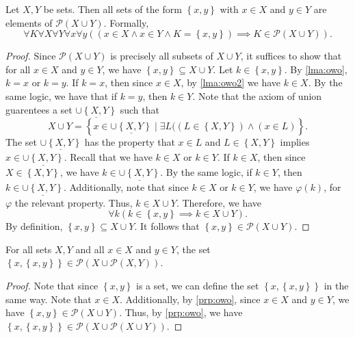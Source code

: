 \begin{proposition}\label{prp:owo}
	Let $X,Y$ be sets. Then all sets of the form $\left\{ x,y \right\} $ with $x\in X$ and $y\in Y$ are elements of $\mathcal{P} (X \cup Y)$. Formally,
	\[
		\forall K\forall X\forall Y\forall x\forall y((x\in X \land x\in Y \land K=\left\{ x,y \right\} ) \implies K\in \mathcal{P} (X \cup Y))
	.\]
\end{proposition}
\begin{proof}
	Since $\mathcal{P} (X \cup Y)$ is precisely all subsets of $X \cup Y$, it suffices to show that for all $x\in X$ and $y\in Y$, we have $\left\{ x,y \right\} \subseteq X \cup Y$. Let $k\in \left\{ x,y \right\} $. By \cref{lma:owo}, $k=x$ or $k=y$. If $k=x$, then since $x\in X$, by \cref{lma:owo2} we have $k\in X$. By the same logic, we have that if $k=y$, then $k\in Y$. Note that the axiom of union guarentees a set $\underline{\cup\left\{ X,Y \right\} } $ such that
	\[
		X \cup Y = \left\{ x\in \underline{\cup \left\{ X,Y \right\} } \mid \exists L((L\in \left\{ X,Y \right\} )\land (x\in L) \right\} 
	.\]
	The set $\underline{\cup \left\{ X,Y \right\} }$ has the property that $x\in L$ and $L\in \left\{ X,Y \right\} $ implies $x\in \underline{\cup \left\{ X,Y \right\} }$. Recall that we have $k\in X$ or $k\in Y$. If $k\in X$, then since $X\in \left\{ X,Y \right\} $, we have $k\in \underline{\cup \left\{ X,Y \right\} }$. By the same logic, if $k\in Y$, then $k\in\underline{\cup \left\{ X,Y \right\} }$. Additionally, note that since $k\in X$ or $k\in Y$, we have $\varphi (k)$, for $\varphi $ the relevant property. Thus, $k\in X \cup Y$. Therefore, we have
	\[
		\forall k(k\in \left\{ x,y \right\} \implies k\in X \cup Y)
	.\]
	By definition, $\left\{ x,y \right\} \subseteq X \cup Y$. It follows that $\left\{ x,y \right\} \in \mathcal{P} (X \cup Y)$.
\end{proof}
\begin{corollary}\label{cor:pairs}
	For all sets $X,Y$ and all $x\in X$ and $y\in Y$, the set $\left\{ x,\left\{ x,y \right\}  \right\} \in \mathcal{P} (X \cup \mathcal{P} (X,Y))$.
\end{corollary}
\begin{proof}
	Note that since $\left\{ x,y \right\} $ is a set, we can define the set $\left\{ x,\left\{ x,y \right\}  \right\} $ in the same way. Note that $x\in X$. Additionally, by \cref{prp:owo}, since $x\in X$ and $y\in Y$, we have $\left\{ x,y \right\} \in \mathcal{P} (X \cup Y)$. Thus, by \cref{prp:owo}, we have $\left\{ x,\left\{ x,y \right\}  \right\} \in \mathcal{P} (X \cup \mathcal{P} (X \cup Y))$.
\end{proof}

